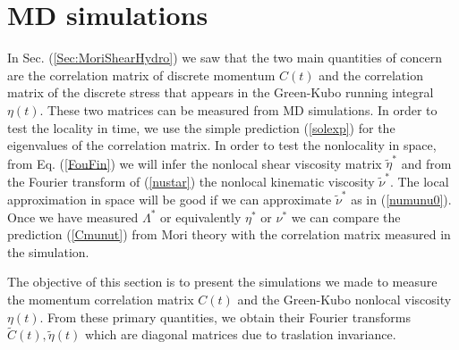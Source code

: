 \documentclass[a4paper,openright,12pt]{book}
\begin{document}


\section{MD simulations}
\label{Sec:SimPBC}
In Sec. (\ref{Sec:MoriShearHydro}) we saw that the  two main  quantities of  concern  are the  correlation matrix  of
discrete momentum  $C(t)$ and the  correlation matrix of  the discrete
stress  that appears  in  the Green-Kubo  running integral  $\eta(t)$.
These two  matrices can be measured  from MD simulations. In  order to
test the locality in time, we use the simple prediction (\ref{solexp})
for the  eigenvalues of the correlation  matrix. In order to  test the
nonlocality  in space,  from Eq.   (\ref{FouFin}) we  will infer  the
nonlocal shear viscosity matrix  $\tilde{\eta}^*$ and from the Fourier
transform   of  (\ref{nustar})   the  nonlocal   kinematic  viscosity
$\tilde{\nu}^*$. The local  approximation in space will be  good if we
can approximate  $\tilde{\nu}^*$ as in (\ref{numunu0}).   Once we have
measured  $\Lambda^*$  or  equivalently  $\eta^*$ or  $\nu^*$  we  can
compare  the  prediction  (\ref{Cmunut})  from Mori  theory  with  the
correlation matrix measured in the simulation.

The objective of this section is to present the simulations we made to measure the
momentum  correlation  matrix  $C(t)$  and  the  Green-Kubo  nonlocal
viscosity $\eta(t)$.   From these primary quantities,  we obtain their
Fourier transforms  $\tilde{C}(t),\tilde{\eta}(t)$ which  are diagonal
matrices  due to  traslation invariance.  
\end{document}
